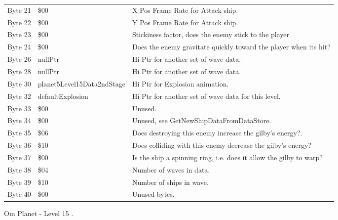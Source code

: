 \begin{figure}[H]
{\begin{adjustbox}{width=12cm}
\begin{tabular}{lll}
 Byte 21 & \$00                        & X Pos Frame Rate for Attack ship.                                  \\
 Byte 22 & \$00                        & Y Pos Frame Rate for Attack ship.                                  \\
 Byte 23 & \$00                        & Stickiness factor, does the enemy stick to the player              \\
 Byte 24 & \$00                        & Does the enemy gravitate quickly toward the player when its hit?   \\
 Byte 26 & nullPtr                    & Hi Ptr for another set of wave data.                               \\
 Byte 28 & nullPtr                    & Hi Ptr for another set of wave data.                               \\
 Byte 30 & planet5Level15Data2ndStage & Hi Ptr for Explosion animation.                                    \\
 Byte 32 & defaultExplosion           & Hi Ptr for another set of wave data for this level.                \\
 Byte 33 & \$00                        & Unused.                                                            \\
 Byte 34 & \$00                        & Unused, see GetNewShipDataFromDataStore.                           \\
 Byte 35 & \$06                        & Does destroying this enemy increase the gilby's energy?.           \\
 Byte 36 & \$10                        & Does colliding with this enemy decrease the gilby's energy?        \\
 Byte 37 & \$00                        & Is the ship a spinning ring, i.e. does it allow the gilby to warp? \\
 Byte 38 & \$04                        & Number of waves in data.                                           \\
 Byte 39 & \$10                        & Number of ships in wave.                                           \\
 Byte 40 & \$00                        & Unused bytes.                                                      \\
\bottomrule
\end{tabular}

  \end{adjustbox}

  }\caption*{Om Planet - Level 15
.}
\end{figure}

